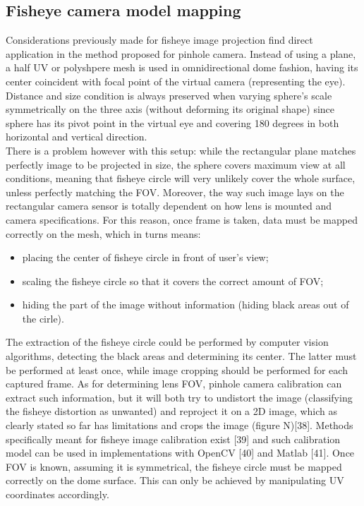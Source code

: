 \subsection{Fisheye camera model mapping}
Considerations previously made for fisheye image projection find direct application in the method proposed for pinhole camera. Instead of using a plane, a half UV or polyshpere mesh is used in omnidirectional dome fashion, having its center coincident with focal point of the virtual camera (representing the eye). Distance and size condition is always preserved when varying sphere’s scale symmetrically on the three axis (without deforming its original shape) since sphere has its pivot point in the virtual eye and covering 180 degrees in both horizontal and vertical direction.\\
There is a problem however with this setup: while the rectangular plane matches perfectly image to be projected in size, the sphere covers maximum view at all conditions, meaning that fisheye circle will very unlikely cover the whole surface, unless perfectly matching the FOV. Moreover, the way such image lays on the rectangular camera sensor is totally dependent on how lens is mounted and camera specifications. For this reason, once frame is taken, data must be mapped correctly on the mesh, which in turns means:
\begin{itemize}
\item placing the center of fisheye circle in front of user’s view;
\item scaling the fisheye circle so that it covers the correct amount of FOV;
\item hiding the part of the image without information (hiding black areas out of the cirle).
\end{itemize}
The extraction of the fisheye circle could be performed by computer vision algorithms, detecting the black areas and determining its center. The latter must be performed at least once, while image cropping should be performed for each captured frame. As for determining lens FOV, pinhole camera calibration can extract such information, but it will both try to undistort the image (classifying the fisheye distortion as unwanted) and reproject it on a 2D image, which as clearly stated so far has limitations and crops the image (figure N)[38]. Methods specifically meant for fisheye image calibration exist [39] and such calibration model can be used in implementations with OpenCV [40] and Matlab [41]. Once FOV is known, assuming it is symmetrical, the fisheye circle must be mapped correctly on the dome surface. This can only be achieved by manipulating UV coordinates accordingly.\\
